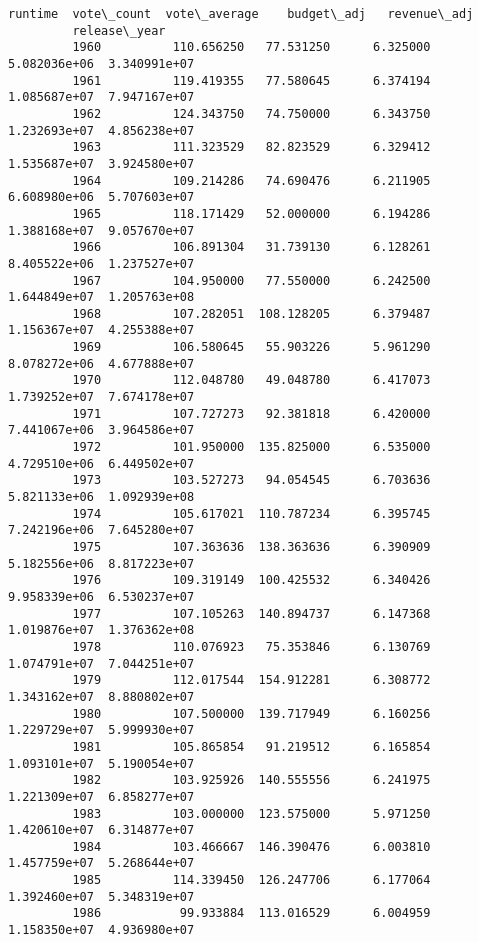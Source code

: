 \documentclass[11pt]{article}
\begin{document}
\begin{Verbatim}[commandchars=\\\{\}]
                          runtime  vote\_count  vote\_average    budget\_adj   revenue\_adj  
         release\_year                                                                    
         1960          110.656250   77.531250      6.325000  5.082036e+06  3.340991e+07  
         1961          119.419355   77.580645      6.374194  1.085687e+07  7.947167e+07  
         1962          124.343750   74.750000      6.343750  1.232693e+07  4.856238e+07  
         1963          111.323529   82.823529      6.329412  1.535687e+07  3.924580e+07  
         1964          109.214286   74.690476      6.211905  6.608980e+06  5.707603e+07  
         1965          118.171429   52.000000      6.194286  1.388168e+07  9.057670e+07  
         1966          106.891304   31.739130      6.128261  8.405522e+06  1.237527e+07  
         1967          104.950000   77.550000      6.242500  1.644849e+07  1.205763e+08  
         1968          107.282051  108.128205      6.379487  1.156367e+07  4.255388e+07  
         1969          106.580645   55.903226      5.961290  8.078272e+06  4.677888e+07  
         1970          112.048780   49.048780      6.417073  1.739252e+07  7.674178e+07  
         1971          107.727273   92.381818      6.420000  7.441067e+06  3.964586e+07  
         1972          101.950000  135.825000      6.535000  4.729510e+06  6.449502e+07  
         1973          103.527273   94.054545      6.703636  5.821133e+06  1.092939e+08  
         1974          105.617021  110.787234      6.395745  7.242196e+06  7.645280e+07  
         1975          107.363636  138.363636      6.390909  5.182556e+06  8.817223e+07  
         1976          109.319149  100.425532      6.340426  9.958339e+06  6.530237e+07  
         1977          107.105263  140.894737      6.147368  1.019876e+07  1.376362e+08  
         1978          110.076923   75.353846      6.130769  1.074791e+07  7.044251e+07  
         1979          112.017544  154.912281      6.308772  1.343162e+07  8.880802e+07  
         1980          107.500000  139.717949      6.160256  1.229729e+07  5.999930e+07  
         1981          105.865854   91.219512      6.165854  1.093101e+07  5.190054e+07  
         1982          103.925926  140.555556      6.241975  1.221309e+07  6.858277e+07  
         1983          103.000000  123.575000      5.971250  1.420610e+07  6.314877e+07  
         1984          103.466667  146.390476      6.003810  1.457759e+07  5.268644e+07  
         1985          114.339450  126.247706      6.177064  1.392460e+07  5.348319e+07  
         1986           99.933884  113.016529      6.004959  1.158350e+07  4.936980e+07  

\end{Verbatim}
\end{document}
